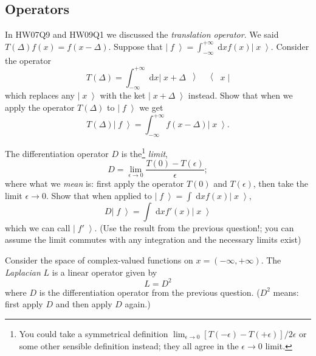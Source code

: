 \documentclass[answers]{exam}\newcommand{\repositoryInformationSetup}{     \usepackage[dvipsnames]{xcolor}     \usepackage[ angle=90, color=black, opacity=1, scale=2, ]{background}      \SetBgPosition{current page.west}      \SetBgVshift{-4.5mm}      \backgroundsetup{contents={{\color{green}\texttt{-{}-} differs from commit \texttt{aac605f} in 0 files}}} } \newcommand{\commit}{{{\color{green}aac605f}}}\usepackage{amsmath}
\newcommand{\goesto}{\ensuremath{\rightarrow}}
\providecommand{\id}{}
\renewcommand{\id}[1]{\ensuremath{\; \mathrm{d}#1}}
\newcommand{\ket}[1]{\ensuremath{\left|\;#1\;\right\rangle}}
\newcommand{\operator}[3]{\ensuremath{\left|\;#1\;\middle\rangle\; #2\; \middle\langle\;#3\;\right|}}
\begin{document}
\begin{questions}
	\clearpage
	\section*{Operators}
	\question In HW07Q9 and HW09Q1 we discussed the \emph{translation operator}.  We said $T(\Delta) f(x) = f(x-\Delta)$.
Suppose that $\ket{f} = \int_{-\infty}^{+\infty} \id{x} f(x) \ket{x}$.
Consider the operator
\begin{equation}
	T(\Delta) = \int_{-\infty}^{+\infty} \id{x} \operator{x+\Delta}{}{x}
\end{equation}
which replaces any \ket{x} with the ket $\ket{x+\Delta}$ instead.
Show that when we apply the operator $T(\Delta)$ to \ket{f} we get
\begin{equation}
	T(\Delta)\ket{f} = \int_{-\infty}^{+\infty} f(x-\Delta) \ket{x}.
\end{equation}

\begin{solution}\end{solution}

\question The differentiation operator $D$ is the\footnote{You could take a symmetrical definition $\lim_{\epsilon\goesto0}[T(-\epsilon) - T(+\epsilon)]/2\epsilon$ or some other sensible definition instead; they all agree in the $\epsilon\goesto0$ limit.} \emph{limit},
\begin{equation}
	D = \lim_{\epsilon\goesto0}\frac{T(0) - T(\epsilon)}{\epsilon};
\end{equation}
where what we \emph{mean} is: first apply the operator $T(0)$ and $T(\epsilon)$, then take the limit $\epsilon\goesto0$.
Show that when applied to $\ket{f} = \int\id{x} f(x) \ket{x}$,
\begin{equation}
	D\ket{f} = \int \id{x} f'(x) \ket{x}
\end{equation}
which we can call $\ket{f'}$.
(Use the result from the previous question!; you can assume the limit commutes with any integration and the necessary limits exist)
\begin{solution}\end{solution}
 	\question Consider the space of complex-valued functions on $x=(-\infty,+\infty)$.
The \emph{Laplacian} $L$ is a linear operator given by
\begin{equation}
	L = D^2
\end{equation}
where $D$ is the differentiation operator from the previous question. ($D^2$ means: first apply $D$ and then apply $D$ again.)
\end{questions}
\end{document}
